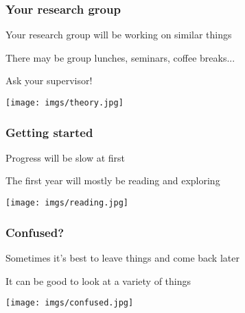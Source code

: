 \begin{frame}
    \frametitle{Your research group}
    \centering
    \begin{minipage}{0.4\textwidth}
        \centering
        \Large

        Your \alert{research group} will be working
        on similar things

        \vspace{1em}

        There may be group lunches, seminars, coffee breaks...

        \vspace{1em}

        Ask your supervisor!

    \end{minipage}
    \qquad
    \begin{minipage}{0.4\textwidth}
        \texttt{[image: imgs/theory.jpg]}
    \end{minipage}
\end{frame}
\begin{frame}
    \frametitle{Getting started}
    \centering
    \begin{minipage}{0.40\textwidth}
        \centering
        \Large

        Progress will be \alert{slow} at first

        \vspace{1em}

        The first year will mostly be \alert{reading} and
        \alert{exploring}

        \vspace{1em}
    \end{minipage}
    \qquad
    \begin{minipage}{0.4\textwidth}
        \texttt{[image: imgs/reading.jpg]}
    \end{minipage}
\end{frame}
\begin{frame}
    \frametitle{Confused?}
    \centering
    \begin{minipage}{0.4\textwidth}
        \centering
        \Large

        Sometimes it's best to leave things and
        \alert{come back later}

        \vspace{1em}

        It can be good to look at a \alert{variety}
        of things
    \end{minipage}
    \qquad
    \begin{minipage}{0.4\textwidth}
        \texttt{[image: imgs/confused.jpg]}
    \end{minipage}
\end{frame}
